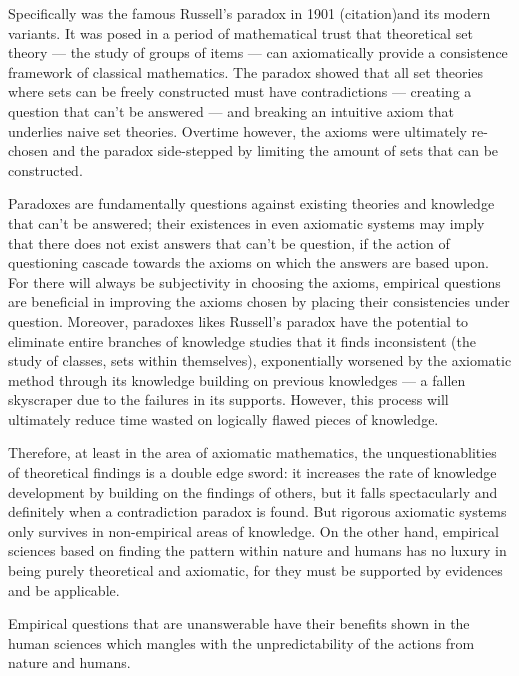 \documentclass[a4paper,12pt]{article}
\begin{document}
Specifically was the famous Russell's paradox in 1901 (citation)and its modern variants. It was posed in a period of mathematical trust that theoretical set theory --- the study of groups of items --- can axiomatically provide a consistence framework of classical mathematics. The paradox showed that all set theories where sets can be freely constructed must have contradictions --- creating a question that can't be answered --- and breaking an intuitive axiom that underlies naive set theories. Overtime however, the axioms were ultimately re-chosen and the paradox side-stepped by limiting the amount of sets that can be constructed.

Paradoxes are fundamentally questions against existing theories and knowledge that can't be answered; their existences in even axiomatic systems may imply that there does not exist answers that can't be question, if the action of questioning cascade towards the axioms on which the answers are based upon. For there will always be subjectivity in choosing the axioms, empirical questions are beneficial in improving the axioms chosen by placing their consistencies under question. Moreover, paradoxes likes Russell's paradox have the potential to eliminate entire branches of knowledge studies that it finds inconsistent (the study of classes, sets within themselves), exponentially worsened by the axiomatic method through its knowledge building on previous knowledges --- a fallen skyscraper due to the failures in its supports. However, this process will ultimately reduce time wasted on logically flawed pieces of knowledge.

Therefore, at least in the area of axiomatic mathematics, the unquestionablities of theoretical findings is a double edge sword: it increases the rate of knowledge development by building on the findings of others, but it falls spectacularly and definitely when a contradiction paradox is found. But rigorous axiomatic systems only survives in non-empirical areas of knowledge. On the other hand, empirical sciences based on finding the pattern within nature and humans has no luxury in being purely theoretical and axiomatic, for they must be supported by evidences and be applicable.

Empirical questions that are unanswerable have their benefits shown in the human sciences which mangles with the unpredictability of the actions from nature and humans.



\end{document}
